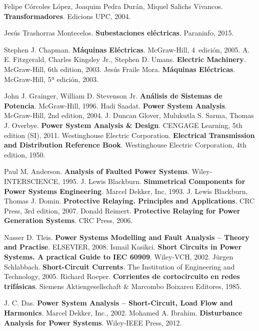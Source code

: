 \begin{thebibliography}{99}
     Felipe Córcoles López, Joaquim Pedra Durán, Miquel Salichs Vivancos. \textbf{Transformadores}.  Edicions UPC, 2004.

     Jesús Trashorras Montecelos. \textbf{Subestaciones eléctricas}.  Paraninfo, 2015.


     Stephen J. Chapman. \textbf{Máquinas Eléctricas}.  McGraw-Hill, 4\textordfeminine\ edición, 2005.
     A. E. Fitzgerald, Charles Kingsley Jr., Stephen D. Umans. \textbf{Electric Machinery}.  McGraw-Hill, 6th edition, 2003.
     Jesús Fraile Mora. \textbf{Máquinas Eléctricas}.  McGraw-Hill, 5ª edición, 2003.

     John J. Grainger, William D. Stevenson Jr. \textbf{Análisis de Sistemas de Potencia}.  McGraw-Hill, 1996.
     Hadi Saadat. \textbf{Power System Analysis}.  McGraw-Hill, 2nd edition, 2004.
     J. Duncan Glover, Mulukutla S. Sarma, Thomas J. Overbye. \textbf{Power System Analysis \& Design}.  CENGAGE Learning, 5th edition (SI), 2011.
     Westinghouse Electric Corporation. \textbf{Electrical Transmission and Distribution Reference Book}.  Westinghouse Electric Corporation, 4th edition, 1950.

     Paul M. Anderson. \textbf{Analysis of Faulted Power Systems}.  Wiley-INTERSCIENCE, 1995.
     J. Lewis Blackburn. \textbf{Simmetrical Components for Power Systems Engineering}.  Marcel Dekker, Inc, 1993.
     J. Lewis Blackburn, Thomas J. Domin. \textbf{Protective Relaying. Principles and Applications}.  CRC Press, 3rd edition, 2007.
     Donald Reimert. \textbf{Protective Relaying for Power Generation Systems}.  CRC Press, 2006.


     Nasser D. Tleis. \textbf{Power Systems Modelling and Fault Analysis -- Theory and Practise}.  ELSEVIER, 2008.
     Ismail Kasikci. \textbf{Short Circuits in Power Systems. A practical Guide to IEC 60909}.  Wiley-VCH, 2002.
     Jürgen Schlabbach. \textbf{Short-Circuit Currents}.  The Institution of Engineering and Technology, 2005.
     Richard Roeper. \textbf{Corrientes de cortocircuito en redes trifásicas}.  Siemens Aktiengesellschaft \& Marcombo Boixareu Editores, 1985.

     J. C. Das. \textbf{Power System Analysis -- Short-Circuit, Load Flow and Harmonics}. Marcel Dekker, Inc., 2002.
     Mohamed A. Ibrahim. \textbf{Disturbance Analysis for Power Systems}. Wiley-IEEE Press, 2012.


\end{thebibliography}
